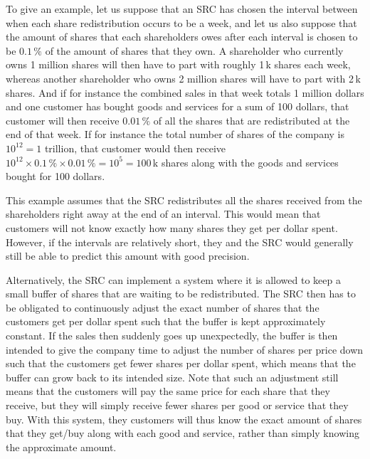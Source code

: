 \documentclass{article}
\begin{document}
To give an example, let us suppose that an SRC has chosen the interval between when each share redistribution occurs to be a week, and let us also suppose that the amount of shares that each shareholders owes after each interval is chosen to be $0.1\, \%$ of the amount of shares that they own. A shareholder who currently owns 1 million shares will then have to part with roughly 1\,k shares each week, whereas another shareholder who owns 2 million shares will have to part with 2\,k shares. And if for instance the combined sales in that week totals 1 million dollars and one customer has bought goods and services for a sum of 100 dollars, that customer will then receive $0.01\,\%$ of all the shares that are redistributed at the end of that week. 
If for instance the total number of shares of the company is $10^{12}=1$ trillion, that customer would then receive $10^{12} \times 0.1\,\% \times 0.01\,\% = 10^{5}=100$\,k shares along with the goods and services bought for 100 dollars. 

This example assumes that the SRC redistributes all the shares received from the shareholders right away at the end of an interval. This would mean that customers will not know exactly how many shares they get per dollar spent. However, if the intervals are relatively short, they and the SRC would generally still be able to predict this amount with good precision. 

Alternatively, the SRC can implement a system where it is allowed to keep a small buffer of shares that are waiting to be redistributed. The SRC then has to be obligated to continuously adjust the exact number of shares that the customers get per dollar spent such that the buffer is kept approximately constant. If the sales then suddenly goes up unexpectedly, the buffer is then intended to give the company time to adjust the number of shares per price down such that the customers get fewer shares per dollar spent, which means that the buffer can grow back to its intended size. Note that such an adjustment still means that the customers will pay the same price for each share that they receive, but they will simply receive fewer shares per good or service that they buy. With this system, they customers will thus know the exact amount of shares that they get/buy along with each good and service, rather than simply knowing the approximate amount. 

\end{document}
